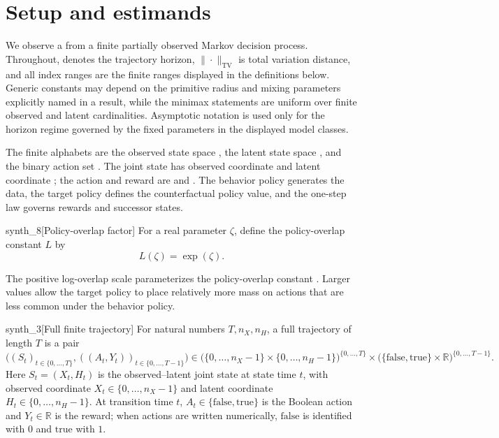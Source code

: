 \section{Setup and estimands}

We observe a  from a finite partially observed Markov decision process. Throughout,  denotes the trajectory horizon, \(\|\cdot\|_{\mathrm{TV}}\) is total variation distance, and all index ranges are the finite ranges displayed in the definitions below. Generic constants may depend on the primitive radius and mixing parameters explicitly named in a result, while the minimax statements are uniform over finite observed and latent cardinalities. Asymptotic notation is used only for the horizon regime governed by the fixed parameters in the displayed model classes.

The finite alphabets are the observed state space , the latent state space , and the binary action set . The joint state  has observed coordinate  and latent coordinate ; the action and reward are  and . The behavior policy  generates the data, the target policy  defines the counterfactual policy value, and the one-step law  governs rewards and successor states.

\begin{definitionv}{synth_8}[Policy-overlap factor]
For a real parameter \(\zeta\), define the policy-overlap constant \(L\) by
\[
L(\zeta)=\exp(\zeta).
\]
\end{definitionv}

The positive log-overlap scale  parameterizes the policy-overlap constant . Larger values allow the target policy to place relatively more mass on actions that are less common under the behavior policy.

\begin{definitionv}{synth_3}[Full finite trajectory]
For natural numbers \(T,n_X,n_H\), a full trajectory of length \(T\) is a pair
\[
\bigl((S_t)_{t\in\{0,\ldots,T\}},((A_t,Y_t))_{t\in\{0,\ldots,T-1\}}\bigr)
\in
\bigl(\{0,\ldots,n_X-1\}\times \{0,\ldots,n_H-1\}\bigr)^{\{0,\ldots,T\}}
\times
\bigl(\{\mathrm{false},\mathrm{true}\}\times \mathbb R\bigr)^{\{0,\ldots,T-1\}} .
\]
Here \(S_t=(X_t,H_t)\) is the observed--latent joint state at state time \(t\), with observed coordinate \(X_t\in\{0,\ldots,n_X-1\}\) and latent coordinate \(H_t\in\{0,\ldots,n_H-1\}\). At transition time \(t\), \(A_t\in\{\mathrm{false},\mathrm{true}\}\) is the Boolean action and \(Y_t\in\mathbb R\) is the reward; when actions are written numerically, \(\mathrm{false}\) is identified with \(0\) and \(\mathrm{true}\) with \(1\).
\end{definitionv}

